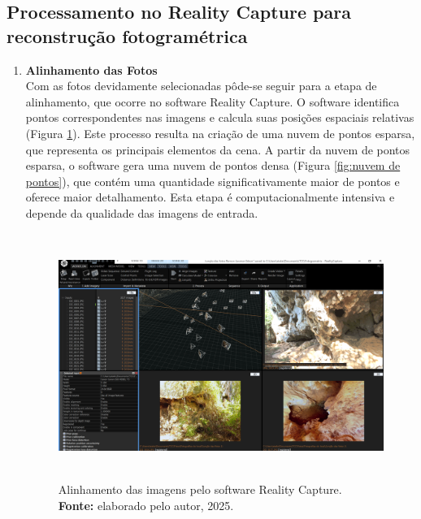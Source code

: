     \subsection{Processamento no Reality Capture para reconstrução fotogramétrica}
    \begin{enumerate}
\item \textbf{Alinhamento das Fotos} \\
Com as fotos devidamente selecionadas pôde-se seguir para a etapa de alinhamento, que ocorre no software Reality Capture. O software identifica pontos correspondentes nas imagens e calcula suas posições espaciais relativas (Figura \ref{fig:alinhamento}). Este processo resulta na criação de uma nuvem de pontos esparsa, que representa os principais elementos da cena. 
A partir da nuvem de pontos esparsa, o software gera uma nuvem de pontos densa (Figura \ref{fig:nuvem de pontos}), que contém uma quantidade significativamente maior de pontos e oferece maior detalhamento. Esta etapa é computacionalmente intensiva e depende da qualidade das imagens de entrada.

\begin{figure}[H]
    \centering
        \centering
        \includegraphics[height=8cm, keepaspectratio]{img/reality e fotogrametria processo/cameras alinhamento.png}
        \caption{Alinhamento das imagens pelo software Reality Capture. \\
            \textbf{Fonte:} elaborado pelo autor, 2025.}
        \label{fig:alinhamento}
\end{figure}


\end{enumerate}
